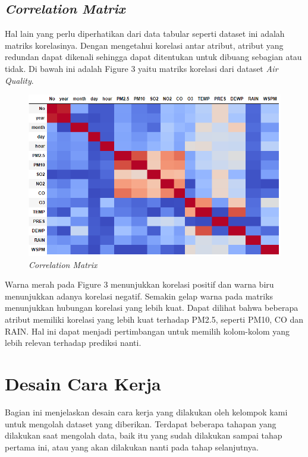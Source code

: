 \documentclass{article}
\begin{document}
\begin{normalsize}
        \subsection{\textit{Correlation Matrix}}
        Hal lain yang perlu diperhatikan dari data tabular seperti dataset ini adalah matriks korelasinya. Dengan
        mengetahui korelasi antar atribut, atribut yang redundan dapat dikenali sehingga dapat ditentukan untuk 
        dibuang sebagian atau tidak. Di bawah ini adalah Figure 3 yaitu matriks korelasi dari dataset \textit{Air Quality}.
        \begin{figure}[h!]
            \centering
            \includegraphics[width=0.5\linewidth]{corr_mat.PNG}
            \caption{\textit{Correlation Matrix}}
            \label{fig:corr_mat}
        \end{figure}
        Warna merah pada Figure 3 menunjukkan korelasi positif dan warna biru menunjukkan adanya korelasi negatif.
        Semakin gelap warna pada matriks menunjukkan hubungan korelasi yang lebih kuat. Dapat dilihat bahwa beberapa
        atribut memiliki korelasi yang lebih kuat terhadap PM2.5, seperti PM10, CO dan RAIN. Hal ini dapat menjadi
        pertimbangan untuk memilih kolom-kolom yang lebih relevan terhadap prediksi nanti.

        \section{Desain Cara Kerja}
        Bagian ini menjelaskan desain cara kerja yang dilakukan oleh kelompok kami untuk mengolah dataset yang 
        diberikan. Terdapat beberapa tahapan yang dilakukan saat mengolah data, baik itu yang sudah dilakukan 
        sampai tahap pertama ini, atau yang akan dilakukan nanti pada tahap selanjutnya.


\end{normalsize}
\end{document}
